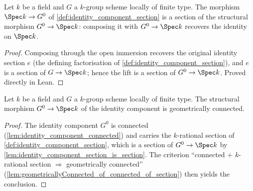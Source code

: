 \begin{lemma}\leanok
  \label{lem:identity_component_section_is_section}
  Let \(k\) be a field and \(G\) a \(k\)-group scheme locally of finite
  type. The morphism \(\Spec k \to G^0\) of
  \cref{def:identity_component_section} is a section of the structural
  morphism \(G^0 \to \Spec k\): composing it with \(G^0 \to \Spec k\)
  recovers the identity on \(\Spec k\).
\end{lemma}
\begin{proof}
  Composing through the open immersion recovers the original identity
  section \(e\) (the defining factorisation of
  \cref{def:identity_component_section}), and \(e\) is a section of
  \(G \to \Spec k\); hence the lift is a section of \(G^0 \to \Spec k\).
  Proved directly in Lean.
\end{proof}

\begin{lemma}\leanok
  \label{lem:identity_component_geometrically_connected}
  Let \(k\) be a field and \(G\) a \(k\)-group scheme locally of finite
  type. The structural morphism \(G^0 \to \Spec k\) of the identity
  component is geometrically connected.
\end{lemma}
\begin{proof}
  \leanok
  The identity component \(G^0\) is connected
  (\cref{lem:identity_component_connected}) and carries the \(k\)-rational
  section of \cref{def:identity_component_section}, which is a section of
  \(G^0 \to \Spec k\) by \cref{lem:identity_component_section_is_section}.
  The criterion ``connected \(+\) \(k\)-rational section \(\Rightarrow\)
  geometrically connected''
  (\cref{lem:geometricallyConnected_of_connected_of_section}) then yields
  the conclusion.
\end{proof}

